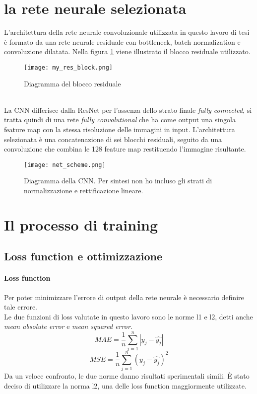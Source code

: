 \section{la rete neurale selezionata}
L'architettura della rete neurale convoluzionale utilizzata in questo lavoro di tesi è formato da una rete neurale residuale con bottleneck, batch normalization e convoluzione dilatata. Nella figura \ref{my_res_block} viene illustrato il blocco residuale utilizzato.
\begin{figure}[ht]
    \centering
    \texttt{[image: my\_res\_block.png]}
    \caption[Diagramma del blocco residuale]{Diagramma del blocco residuale}
    \label{my_res_block}
\end{figure}\\
La CNN differisce dalla ResNet per l'assenza dello strato finale \textit{fully connected}, si tratta quindi di una rete \textit{fully convolutional} che ha come output una singola feature map con la stessa risoluzione delle immagini in input. L'architettura selezionata è una concatenazione di sei blocchi residuali, seguito da una convoluzione che combina le 128 feature map restituendo l'immagine risultante.
\begin{figure}[ht]
    \centering
    \texttt{[image: net\_scheme.png]}
    \caption[Architettura della CNN]{Diagramma della CNN. Per sintesi non ho incluso gli strati di normalizzazione e rettificazione lineare.}
    \label{my_net}
\end{figure}

\section{Il processo di training}
\subsection{Loss function e ottimizzazione}
\paragraph{Loss function} Per poter minimizzare l'errore di output della rete neurale è necessario definire tale errore.\\
Le due funzioni di loss valutate in questo lavoro sono le norme l1 e l2, detti anche \textit{mean absolute error} e \textit{mean squared error}.
$$MAE=\frac{1}{n} \sum_{j=1}^{n} |y_j-\hat{y_j}|$$
$$MSE=\frac{1}{n} \sum_{j=1}^{n} (y_j-\hat{y_j})^2$$
Da un veloce confronto, le due norme danno risultati sperimentali simili. È stato deciso di utilizzare la norma l2, una delle loss function maggiormente utilizzate.

